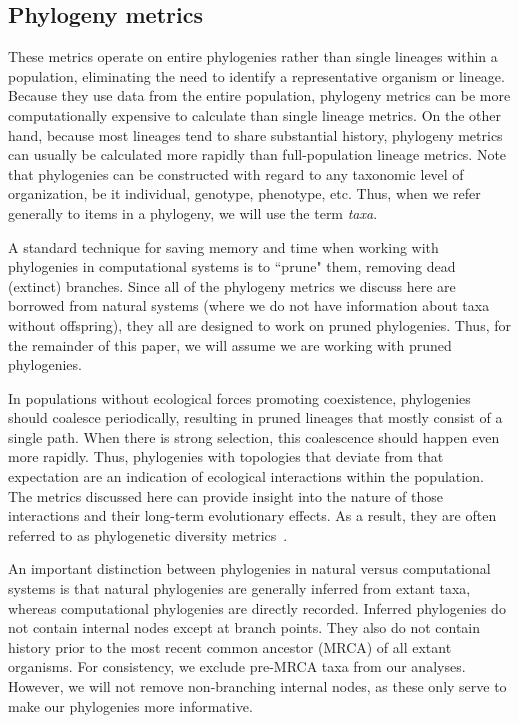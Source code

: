 \documentclass[letterpaper]{article}
\begin{document}
\subsection{Phylogeny metrics}

These metrics operate on entire phylogenies rather than single lineages within a population, eliminating the need to identify a representative organism or lineage.
Because they use data from the entire population, phylogeny metrics can be more computationally expensive to calculate than single lineage metrics. On the other hand, because most lineages tend to share substantial history, phylogeny metrics can usually be calculated more rapidly than full-population lineage metrics. %
Note that phylogenies can be constructed with regard to any taxonomic level of organization, be it individual, genotype, phenotype, etc. Thus, when we refer generally to items in a phylogeny, we will use the term \textit{taxa}.

A standard technique for saving memory and time when working with phylogenies in computational systems is to ``prune" them, removing 
dead (extinct) branches.
Since all of the phylogeny metrics we discuss here are borrowed from natural systems (where we do not have information about taxa without offspring), they all are designed to work on pruned phylogenies. Thus, for the remainder of this paper, we will assume we are working with pruned phylogenies.

In populations without ecological forces promoting coexistence, phylogenies should coalesce periodically, resulting in pruned lineages that mostly consist of a single path. When there is strong selection, this coalescence should happen even more rapidly. Thus, phylogenies with topologies that deviate from that expectation are an indication of ecological interactions within the population. The metrics discussed here can provide insight into the nature of those interactions and their long-term evolutionary effects. As a result, they are often referred to as phylogenetic diversity metrics~\citep{tucker_guide_2017}.

An important distinction between phylogenies in natural versus computational systems 
is that natural phylogenies are generally inferred from extant taxa, whereas computational phylogenies are directly recorded. %
Inferred phylogenies 
do not contain internal nodes except at branch points. They also do not contain history prior to the most recent common ancestor (MRCA) of all extant organisms. %
For consistency, we exclude pre-MRCA taxa from our analyses. However, we will not remove non-branching internal nodes, as these only serve to make our phylogenies more informative.
\end{document}
